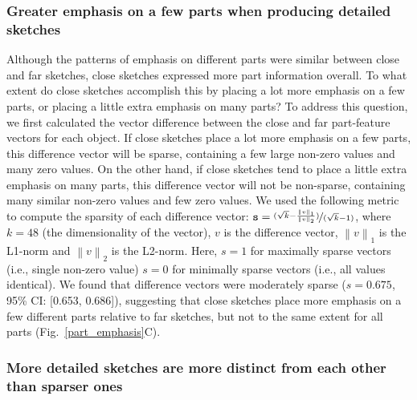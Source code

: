 \documentclass[10pt,letterpaper]{article}
\newcommand\norm[1]{\left\lVert#1\right\rVert}
\begin{document}
\subsubsection{Greater emphasis on a few parts when producing detailed sketches}

Although the patterns of emphasis on different parts were similar between close and far sketches, close sketches expressed more part information overall.
To what extent do close sketches accomplish this by placing a lot more emphasis on a few parts, or placing a little extra emphasis on many parts?
To address this question, we first calculated the vector difference between the close and far part-feature vectors for each object.
If close sketches place a lot more emphasis on a few parts, this difference vector will be sparse, containing a few large non-zero values and many zero values. 
On the other hand, if close sketches tend to place a little extra emphasis on many parts, this difference vector will not be non-sparse, containing many similar non-zero values and few zero values. 
We used the following metric to compute the sparsity of each difference vector:
$\texttt{s}= \nicefrac{(\sqrt{k} - \frac{\norm{v}_1}{\norm{v}_2})}{(\sqrt{k}-1)}$, where $k=48$ (the dimensionality of the vector), $v$ is the difference vector, $\norm{v}_1$ is the L1-norm and $\norm{v}_2$ is the L2-norm. 
Here, $s=1$ for maximally sparse vectors (i.e., single non-zero value) $s=0$ for minimally sparse vectors (i.e., all values identical).
We found that difference vectors were moderately sparse ($s=0.675$, 95\% CI: [0.653, 0.686]), suggesting that close sketches place more emphasis on a few different parts relative to far sketches, but not to the same extent for all parts (Fig.~\ref{part_emphasis}C).

\subsubsection{More detailed sketches are more distinct from each other than sparser ones}
\end{document}
